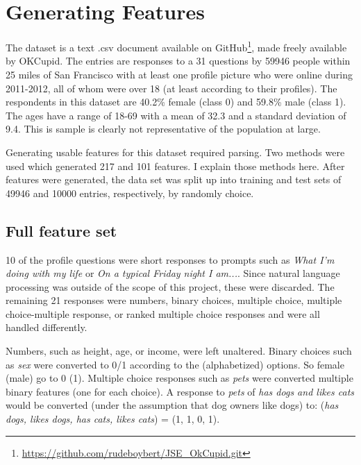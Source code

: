 \documentclass{article} %
\begin{document}
\section{Generating Features}
\label{sec:features}
The dataset is a text .csv document available on GitHub\footnote{\url{https://github.com/rudeboybert/JSE_OkCupid.git}}, made freely available by OKCupid.  The entries are responses to a 31 questions by 59946 people within 25 miles of San Francisco with at least one profile picture who were online during 2011-2012, all of whom were over 18 (at least according to their profiles).  The respondents in this dataset are 40.2\% female (class 0) and 59.8\% male (class 1).  The ages have a range of 18-69 with a mean of 32.3 and a standard deviation of 9.4.  This is sample is clearly not representative of the population at large.

Generating usable features for this dataset required parsing.  Two methods were used which generated 217 and 101 features.  I explain those methods here.  After features were generated, the data set was split up into training and test sets of 49946 and 10000 entries, respectively, by randomly choice.

\subsection{Full feature set}
\label{sec:full_features}
10 of the profile questions were short responses to prompts such as \textit{What I'm doing with my life} or \textit{On a typical Friday night I am...}.  Since natural language processing was outside of the scope of this project, these were discarded.  The remaining 21 responses were numbers, binary choices, multiple choice, multiple choice-multiple response, or ranked multiple choice responses and were all handled differently.

Numbers, such as height, age, or income, were left unaltered.  Binary choices such as \textit{sex} were converted to 0/1 according to the (alphabetized) options.  So female (male) go to 0 (1).  Multiple choice responses such as \textit{pets} were converted multiple binary features (one for each choice).  A response to \textit{pets} of \textit{has dogs and likes cats} would be converted (under the assumption that dog owners like dogs) to: (\textit{has dogs, likes dogs, has cats, likes cats}) = (1, 1, 0, 1).
\end{document}
